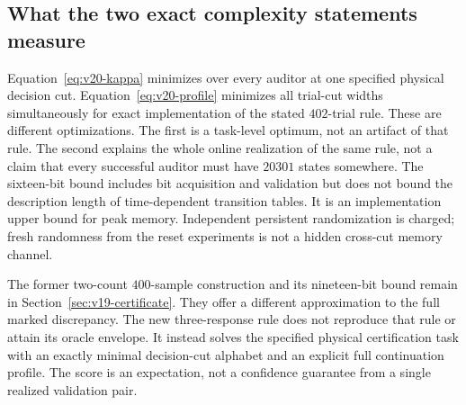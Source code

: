 \subsection{What the two exact complexity statements measure}
Equation~\eqref{eq:v20-kappa} minimizes over every auditor at one
specified physical decision cut. Equation~\eqref{eq:v20-profile}
minimizes all trial-cut widths simultaneously for exact implementation
of the stated $402$-trial rule. These are different optimizations.
The first is a task-level optimum, not an artifact of that rule. The
second explains the whole online realization of the same rule, not a
claim that every successful auditor must have $20301$ states somewhere.
The sixteen-bit bound includes bit acquisition and validation but does
not bound the description length of time-dependent transition tables.
It is an implementation upper bound for peak memory. Independent
persistent randomization is charged; fresh randomness from the reset
experiments is not a hidden cross-cut memory channel.

The former two-count $400$-sample construction and its nineteen-bit bound
remain in Section~\ref{sec:v19-certificate}. They offer a different
approximation to the full marked discrepancy. The new three-response
rule does not reproduce that rule or attain its oracle envelope. It
instead solves the specified physical certification task with an exactly
minimal decision-cut alphabet and an explicit full continuation profile.
The score is an expectation, not a confidence guarantee from a single
realized validation pair.
